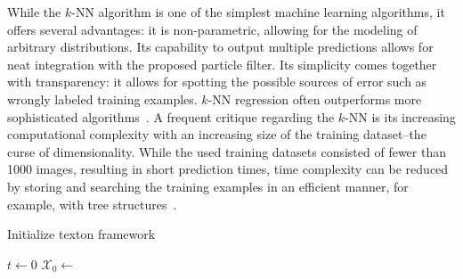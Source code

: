 \documentclass{report}
\begin{document}
While the $k$-NN algorithm is one of the simplest machine learning
algorithms, it offers several advantages: it is non-parametric,
allowing for the modeling of arbitrary distributions. Its capability
to output multiple predictions allows for neat integration with the
proposed particle filter. Its simplicity comes together with
transparency: it allows for spotting the possible sources of error
such as wrongly labeled training examples. $k$-NN regression often
outperforms more sophisticated algorithms~\cite{knn}. A frequent
critique regarding the $k$-NN is its increasing computational
complexity with an increasing size of the training dataset--the curse
of dimensionality. While the used training datasets consisted of fewer
than 1000 images, resulting in short prediction times, time complexity
can be reduced by storing and searching the training examples in an
efficient manner, for example, with tree
structures~\cite{bhatia2010survey}.

\begin{algorithm}
\caption{Initialize texton framework}
\label{alg:trexton_init}
  \begin{algorithmic}[1]
    \State $t \gets 0$ 
    \State $\mathcal{X}_0 \gets$ 
    \EndProcedure
  \end{algorithmic}
\end{algorithm}

\end{document}
